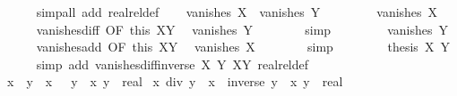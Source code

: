 \begin{isabellebody}
\ \ \ \ \isamarkupfalse%
\ {\isacharparenleft}{\kern0pt}simp{\isacharunderscore}{\kern0pt}all\ add{\isacharcolon}{\kern0pt}\ realrel{\isacharunderscore}{\kern0pt}def{\isacharparenright}{\kern0pt}\isanewline
\ \ \isamarkupfalse%
\ {\isachardoublequoteopen}vanishes\ X\ {\isasymlongleftrightarrow}\ vanishes\ Y{\isachardoublequoteclose}\isanewline
\ \ \isamarkupfalse%
\isanewline
\ \ \ \ \isamarkupfalse%
\ {\isachardoublequoteopen}vanishes\ X{\isachardoublequoteclose}\isanewline
\ \ \ \ \isamarkupfalse%
\ vanishes{\isacharunderscore}{\kern0pt}diff\ {\isacharbrackleft}{\kern0pt}OF\ this\ XY{\isacharbrackright}{\kern0pt}\ \isamarkupfalse%
\ {\isachardoublequoteopen}vanishes\ Y{\isachardoublequoteclose}\isanewline
\ \ \ \ \ \ \isamarkupfalse%
\ simp\isanewline
\ \ \isamarkupfalse%
\isanewline
\ \ \ \ \isamarkupfalse%
\ {\isachardoublequoteopen}vanishes\ Y{\isachardoublequoteclose}\isanewline
\ \ \ \ \isamarkupfalse%
\ vanishes{\isacharunderscore}{\kern0pt}add\ {\isacharbrackleft}{\kern0pt}OF\ this\ XY{\isacharbrackright}{\kern0pt}\ \isamarkupfalse%
\ {\isachardoublequoteopen}vanishes\ X{\isachardoublequoteclose}\isanewline
\ \ \ \ \ \ \isamarkupfalse%
\ simp\isanewline
\ \ \isamarkupfalse%
\isanewline
\ \ \isamarkupfalse%
\ \isamarkupfalse%
\ {\isachardoublequoteopen}{\isacharquery}{\kern0pt}thesis\ X\ Y{\isachardoublequoteclose}\isanewline
\ \ \ \ \isamarkupfalse%
\ {\isacharparenleft}{\kern0pt}simp\ add{\isacharcolon}{\kern0pt}\ vanishes{\isacharunderscore}{\kern0pt}diff{\isacharunderscore}{\kern0pt}inverse\ X\ Y\ XY\ realrel{\isacharunderscore}{\kern0pt}def{\isacharparenright}{\kern0pt}\isanewline
{}\isamarkupfalse%
%
\endisatagproof
{\isafoldproof}%
%
\isadelimproof
\isanewline
%
\endisadelimproof
\isanewline
{}\isamarkupfalse%
\ {\isachardoublequoteopen}x\ {\isacharminus}{\kern0pt}\ y\ {\isacharequal}{\kern0pt}\ x\ {\isacharplus}{\kern0pt}\ {\isacharminus}{\kern0pt}\ y{\isachardoublequoteclose}\ \ x\ y\ {\isacharcolon}{\kern0pt}{\isacharcolon}{\kern0pt}\ real\isanewline
\isanewline
{}\isamarkupfalse%
\ {\isachardoublequoteopen}x\ div\ y\ {\isacharequal}{\kern0pt}\ x\ {\isacharasterisk}{\kern0pt}\ inverse\ y{\isachardoublequoteclose}\ \ x\ y\ {\isacharcolon}{\kern0pt}{\isacharcolon}{\kern0pt}\ real\isanewline

\end{isabellebody}
